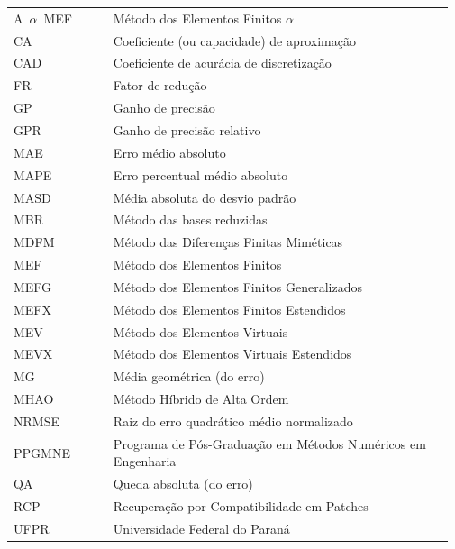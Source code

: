 

\begin{listaabrev}

\begin{longtable}[l]{p{0.22\linewidth}p{0.75\linewidth}}
A~$\alpha$~MEF & Método dos Elementos Finitos $\alpha$ \\
CA & Coeficiente (ou capacidade) de aproximação \\
CAD & Coeficiente de acurácia de discretização \\
FR & Fator de redução \\
GP & Ganho de precisão \\
GPR & Ganho de precisão relativo \\
MAE & Erro médio absoluto \\
MAPE & Erro percentual médio absoluto \\
MASD & Média absoluta do desvio padrão \\
MBR & Método das bases reduzidas \\
MDFM & Método das Diferenças Finitas Miméticas \\
MEF & Método dos Elementos Finitos \\
MEFG & Método dos Elementos Finitos Generalizados \\
MEFX & Método dos Elementos Finitos Estendidos \\
MEV & Método dos Elementos Virtuais \\
MEVX & Método dos Elementos Virtuais Estendidos \\
MG & Média geométrica (do erro) \\
MHAO & Método Híbrido de Alta Ordem \\
NRMSE & Raiz do erro quadrático médio normalizado \\
PPGMNE & Programa de Pós-Graduação em Métodos Numéricos em Engenharia \\
QA & Queda absoluta (do erro) \\
RCP & Recuperação por Compatibilidade em Patches \\
UFPR & Universidade Federal do Paraná \\
\end{longtable}

\end{listaabrev}


